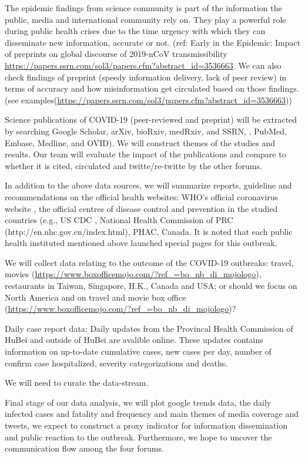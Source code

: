 The epidemic findings from science community is part of the information the public, media and international community rely on. They play a powerful role during public health crises due to the time urgency with which they can disseminate new information, accurate or not. (ref: Early in the Epidemic: Impact of preprints on global discourse of 2019-nCoV transmissibility \url{https://papers.ssrn.com/sol3/papers.cfm?abstract_id=3536663}.  We can also check findings of preprint (speedy information delivery, lack of peer review) in terms of accuracy and how misinformation get circulated based on those findings. (see examples(\url{https://papers.ssrn.com/sol3/papers.cfm?abstract_id=3536663}))

Science publications of COVID-19 (peer-reviewed and preprint) will be extracted by searching Google Scholar, arXiv, bioRxiv, medRxiv, and SSRN, , PubMed, Embase, Medline, and OVID).  We will construct themes of the studies and results.  Our team will evaluate the impact of the publications and compare to whether it is cited, circulated and twitte/re-twitte by the other forums.  

In addition to the above data sources, we will summarize reports, guideline and recommendations on the official health websites:  WHO’s official coronavirus website , the official centres of disease control and prevention in the studied countries (e.g., US CDC , National Health Commission of PRC (http://en.nhc.gov.cn/index.html), PHAC, Canada.   It is noted that each public health instituted mentioned above launched special pages for this outbreak.

We will collect data relating to the outcome of the COVID-19 outbreaks:   travel, movies (\url{https://www.boxofficemojo.com/?ref_=bo_nb_di_mojologo}), restaurants in Taiwan, Singapore, H.K., Canada and USA; or should we focus on North America and on travel and movie box office (\url{https://www.boxofficemojo.com/?ref_=bo_nb_di_mojologo})?

Daily case report data: Daily updates from the Provincal Health Commission of HuBei and outside of HuBei are avalible online. These updates contains information on up-to-date cumulative cases, new cases per day, number of confirm case hospitalized, severity categorizations and deaths.

We will need to curate the data-stream. 


Final stage of our data analysis,  we will plot google trends data, the daily infected cases and fatality and frequency and main themes of media coverage and tweets,  we expect to construct a proxy indicator for information dissemination and public reaction to the outbreak.  Furthermore, we hope to uncover the communication flow among the four forums.

